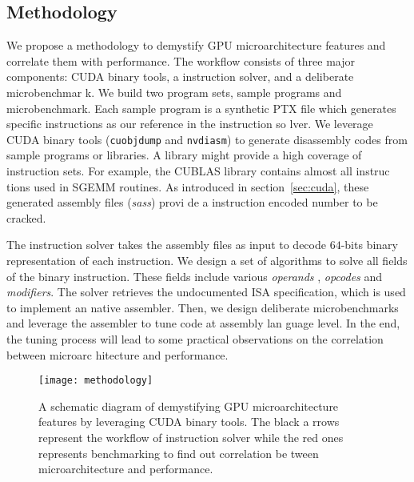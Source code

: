 \subsection{Methodology}

We propose a methodology to demystify GPU microarchitecture features and correlate them with performance. 
The workflow consists of three major components: CUDA binary tools, a instruction solver, and a deliberate microbenchmar
k. 
We build two program sets, sample programs and microbenchmark.
Each sample program is a synthetic PTX file which generates specific instructions as our reference in the instruction so
lver. 
We leverage CUDA binary tools ({\tt cuobjdump} and {\tt nvdiasm}) to generate disassembly codes from sample programs or 
libraries. 
A library might provide a high coverage of instruction sets. For example, the CUBLAS library contains almost all instruc
tions used in SGEMM routines. As introduced in section~\ref{sec:cuda}, these generated assembly files ({\em sass}) provi
de a instruction encoded number to be cracked.

The instruction solver takes the assembly files as input to decode $64$-bits binary representation of each instruction. 
We design a set of algorithms to solve all fields of the binary instruction. These fields include various {\em operands}
, {\em opcodes} and {\em modifiers}. The solver retrieves the undocumented ISA specification, which is used to implement
 an native assembler. Then, we design deliberate microbenchmarks and leverage the assembler to tune code at assembly lan
guage level. In the end, the tuning process will lead to some practical observations on the correlation between microarc
hitecture and performance.

\begin{figure}[htbp]
\begin{center}
\texttt{[image: methodology]}
\caption{A schematic diagram of demystifying GPU microarchitecture features by leveraging CUDA binary tools. The black a
rrows represent the workflow of instruction solver while the red ones represents benchmarking to find out correlation be
tween microarchitecture and performance.}
\label{fig:workflow}
\end{center}
\end{figure}


